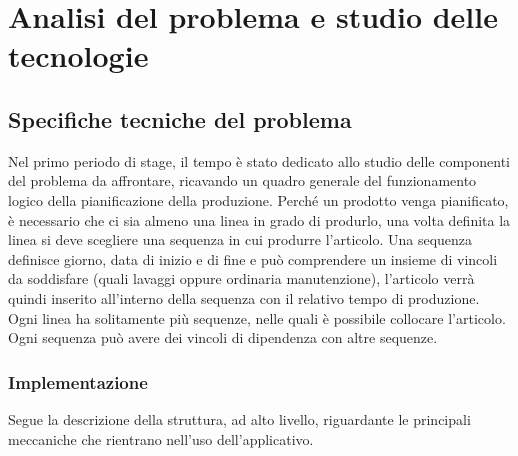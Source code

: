 
\chapter{Analisi del problema e studio delle tecnologie}
\label{cap:progetto-stage}

\section{Specifiche tecniche del problema}

Nel primo periodo di stage, il tempo è stato dedicato allo studio delle componenti del problema da affrontare, ricavando un quadro generale del
funzionamento logico della pianificazione della produzione. 
Perché un prodotto venga pianificato, è necessario che ci sia almeno una linea in grado di produrlo, una volta definita la linea si deve scegliere una sequenza in 
cui produrre l'articolo. Una sequenza definisce giorno, data di inizio e di fine e può comprendere un insieme di vincoli da soddisfare
(quali lavaggi oppure ordinaria manutenzione), l'articolo verrà quindi inserito all'interno della sequenza con il relativo tempo di produzione.
Ogni linea ha solitamente più sequenze, nelle quali è possibile collocare l'articolo. Ogni sequenza può avere dei vincoli di dipendenza con altre sequenze.


\subsection{Implementazione}
Segue la descrizione della struttura, ad alto livello, riguardante le principali meccaniche che rientrano nell'uso dell'applicativo.

